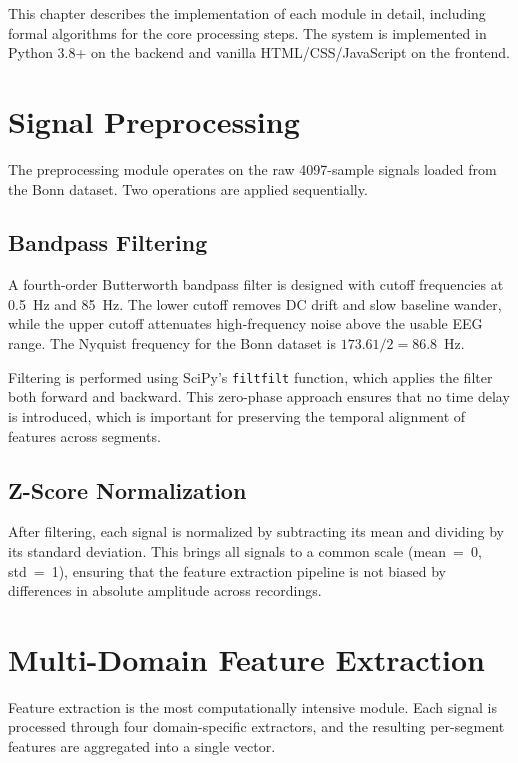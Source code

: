
This chapter describes the implementation of each module in detail, including formal algorithms for the core processing steps. The system is implemented in Python 3.8+ on the backend and vanilla HTML/CSS/JavaScript on the frontend.

\section{Signal Preprocessing}

The preprocessing module operates on the raw 4097-sample signals loaded from the Bonn dataset. Two operations are applied sequentially.

\subsection{Bandpass Filtering}

A fourth-order Butterworth bandpass filter is designed with cutoff frequencies at 0.5~Hz and 85~Hz. The lower cutoff removes DC drift and slow baseline wander, while the upper cutoff attenuates high-frequency noise above the usable EEG range. The Nyquist frequency for the Bonn dataset is $173.61 / 2 = 86.8$~Hz.

Filtering is performed using SciPy's \texttt{filtfilt} function, which applies the filter both forward and backward. This zero-phase approach ensures that no time delay is introduced, which is important for preserving the temporal alignment of features across segments.

\subsection{Z-Score Normalization}

After filtering, each signal is normalized by subtracting its mean and dividing by its standard deviation. This brings all signals to a common scale (mean~=~0, std~=~1), ensuring that the feature extraction pipeline is not biased by differences in absolute amplitude across recordings.

\section{Multi-Domain Feature Extraction}

Feature extraction is the most computationally intensive module. Each signal is processed through four domain-specific extractors, and the resulting per-segment features are aggregated into a single vector.

